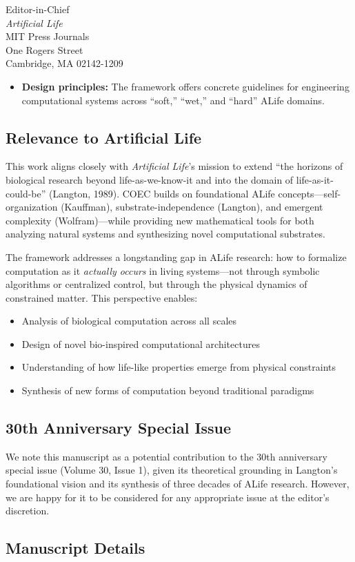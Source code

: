 \documentclass[11pt]{letter}
\begin{document}
\begin{letter}{%
Editor-in-Chief\\
\textit{Artificial Life}\\
MIT Press Journals\\
One Rogers Street\\
Cambridge, MA 02142-1209
}
\begin{itemize}
    \item \textbf{Design principles:} The framework offers concrete guidelines for engineering computational systems across ``soft,'' ``wet,'' and ``hard'' ALife domains.
\end{itemize}

\subsection*{Relevance to Artificial Life}

This work aligns closely with \textit{Artificial Life}'s mission to extend ``the horizons of biological research beyond life-as-we-know-it and into the domain of life-as-it-could-be'' (Langton, 1989). COEC builds on foundational ALife concepts—self-organization (Kauffman), substrate-independence (Langton), and emergent complexity (Wolfram)—while providing new mathematical tools for both analyzing natural systems and synthesizing novel computational substrates.

The framework addresses a longstanding gap in ALife research: how to formalize computation as it \textit{actually occurs} in living systems—not through symbolic algorithms or centralized control, but through the physical dynamics of constrained matter. This perspective enables:

\begin{itemize}
    \item Analysis of biological computation across all scales
    \item Design of novel bio-inspired computational architectures
    \item Understanding of how life-like properties emerge from physical constraints
    \item Synthesis of new forms of computation beyond traditional paradigms
\end{itemize}

\subsection*{30th Anniversary Special Issue}

We note this manuscript as a potential contribution to the 30th anniversary special issue (Volume 30, Issue 1), given its theoretical grounding in Langton's foundational vision and its synthesis of three decades of ALife research. However, we are happy for it to be considered for any appropriate issue at the editor's discretion.

\subsection*{Manuscript Details}


\end{letter}
\end{document}
